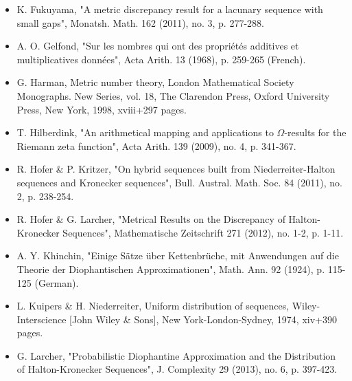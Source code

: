 \documentclass[10pt]{article}
\newcommand{\1}{\mathbf{1}}
\begin{document}
\begin{itemize}
  \item[] [20] K. Fukuyama, "A metric discrepancy result for a lacunary sequence with small gaps", Monatsh. Math. 162 (2011), no. 3, p. 277-288.
  \item[] [21] A. O. Gelfond, "Sur les nombres qui ont des propriétés additives et multiplicatives données", Acta Arith. 13 (1968), p. 259-265 (French).
  \item[] [22] G. Harman, Metric number theory, London Mathematical Society Monographs. New Series, vol. 18, The Clarendon Press, Oxford University Press, New York, 1998, xviii+297 pages.
  \item[] [23] T. Hilberdink, "An arithmetical mapping and applications to $\Omega$-results for the Riemann zeta function", Acta Arith. 139 (2009), no. 4, p. 341-367.
  \item[] [24] R. Hofer \& P. Kritzer, "On hybrid sequences built from Niederreiter-Halton sequences and Kronecker sequences", Bull. Austral. Math. Soc. 84 (2011), no. 2, p. 238-254.
  \item[] [25] R. Hofer \& G. Larcher, "Metrical Results on the Discrepancy of Halton-Kronecker Sequences", Mathematische Zeitschrift 271 (2012), no. 1-2, p. 1-11.
  \item[] [26] A. Y. Khinchin, "Einige Sätze über Kettenbrüche, mit Anwendungen auf die Theorie der Diophantischen Approximationen", Math. Ann. 92 (1924), p. 115-125 (German).
  \item[] [27] L. Kuipers \& H. Niederreiter, Uniform distribution of sequences, Wiley-Interscience [John Wiley \& Sons], New York-London-Sydney, 1974, xiv+390 pages.
  \item[] [28] G. Larcher, "Probabilistic Diophantine Approximation and the Distribution of Halton-Kronecker Sequences", J. Complexity 29 (2013), no. 6, p. 397-423.
\end{itemize}
\end{document}

